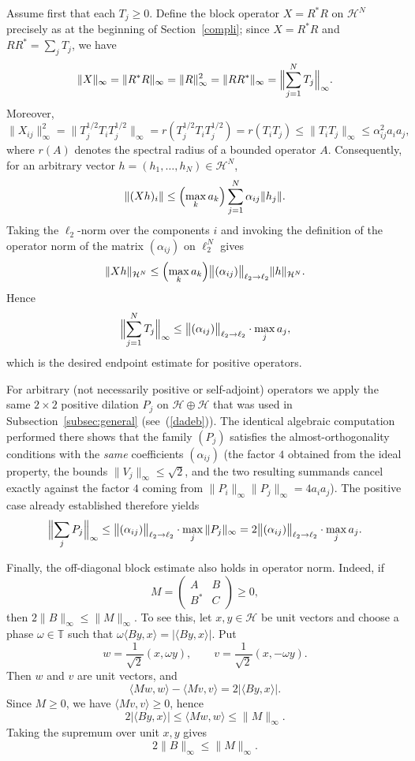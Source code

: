 \documentclass[11pt]{article}
\theoremstyle{definition}
\newcommand{\1}{\mathbf{1}}
\begin{document}
Assume first that each \(T_j\ge 0\). Define the block operator \(X=R^*R\) on \(\mathcal{H}^N\) precisely as at the beginning of Section~\ref{compli}; since \(X=R^*R\) and \(RR^*=\sum_jT_j\), we have
\[
\|X\|_\infty=\|R^*R\|_\infty=\|R\|_\infty^2
=\|RR^*\|_\infty
=\Bigl\|\sum_{j=1}^N T_j\Bigr\|_\infty .
\]
Moreover,
\[
\|X_{ij}\|_\infty^2
=
\|T_j^{1/2}T_iT_j^{1/2}\|_\infty
=
r(T_j^{1/2}T_iT_j^{1/2})
=
r(T_iT_j)
\le
\|T_iT_j\|_\infty
\le
\alpha_{ij}^2a_ia_j, 
\]
where $r(A)$ denotes the spectral radius of a bounded operator $A$.
Consequently, for an arbitrary vector \(h=(h_1,\dots,h_N)\in\mathcal{H}^N\),
\[
\|(Xh)_i\|\le\Bigl(\max_k a_k\Bigr)\sum_{j=1}^N\alpha_{ij}\|h_j\|.
\]
Taking the \(\ell_2\)-norm over the components \(i\) and invoking the definition of the operator norm of the matrix \((\alpha_{ij})\) on \(\ell_2^N\) gives
\[
\|Xh\|_{\mathcal{H}^N}\le\Bigl(\max_k a_k\Bigr)\bigl\|(\alpha_{ij})\bigr\|_{\ell_2\to\ell_2}\|h\|_{\mathcal{H}^N}.
\]
Hence
\[
\Bigl\|\sum_{j=1}^N T_j\Bigr\|_\infty\le\bigl\|(\alpha_{ij})\bigr\|_{\ell_2\to\ell_2}\cdot\max_j a_j,
\]
which is the desired endpoint estimate for positive operators.

For arbitrary (not necessarily positive or self-adjoint) operators we apply the same \(2\times 2\) positive dilation $P_{j}$
on \(\mathcal{H}\oplus\mathcal{H}\) that was used in Subsection~\ref{subsec:general} (see~(\ref{dadeb})). The identical algebraic computation performed there shows that the family \((P_j)\) satisfies the almost-orthogonality conditions with the \emph{same} coefficients \((\alpha_{ij})\) (the factor \(4\) obtained from the ideal property, the bounds
\(\|V_j\|_\infty\le \sqrt2\), and the two resulting summands cancel exactly
against the factor \(4\) coming from \(\|P_i\|_\infty\|P_j\|_\infty=4a_ia_j\)). The positive case already established therefore yields
\[
\Bigl\|\sum_j P_j\Bigr\|_\infty\le\bigl\|(\alpha_{ij})\bigr\|_{\ell_2\to\ell_2}\cdot\max_j\|P_j\|_\infty=2\bigl\|(\alpha_{ij})\bigr\|_{\ell_2\to\ell_2}\cdot\max_j a_j.
\]

 Finally, the off-diagonal block estimate also holds in operator norm. Indeed,
if
\[
M=\begin{pmatrix}A&B\\B^*&C\end{pmatrix}\ge0,
\]
then \(2\|B\|_\infty\le \|M\|_\infty\). To see this, let \(x,y\in\mathcal H\)
be unit vectors and choose a phase \(\omega\in\mathbb T\) such that
\(\omega\langle By,x\rangle=|\langle By,x\rangle|\). Put
\[
w=\frac1{\sqrt2}(x,\omega y),\qquad
v=\frac1{\sqrt2}(x,-\omega y).
\]
Then \(w\) and \(v\) are unit vectors, and
\[
\langle Mw,w\rangle-\langle Mv,v\rangle
=
2|\langle By,x\rangle|.
\]
Since \(M\ge0\), we have \(\langle Mv,v\rangle\ge0\), hence
\[
2|\langle By,x\rangle|
\le
\langle Mw,w\rangle
\le
\|M\|_\infty .
\]
Taking the supremum over unit \(x,y\) gives
\[
2\|B\|_\infty\le \|M\|_\infty .
\]
 
\end{document}
